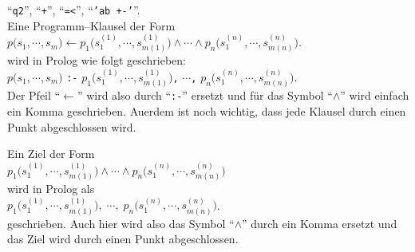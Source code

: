                  ``\texttt{q2}'', ``\texttt{+}'', ``\texttt{=<}'', ``\texttt{'ab +-'}''. \\[0.1cm]
Eine Programm--Klausel der Form \\[0.1cm]
\hspace*{1.3cm} 
$p\big(s_1, \cdots, s_m\big) \leftarrow p_1\big(s^{(1)}_1, \cdots, s^{(1)}_{m(1)}\big) \wedge \cdots \wedge p_n(s^{(n)}_1, \cdots, s^{(n)}_{m(n)}\big)$.  \\[0.1cm]
wird in Prolog wie folgt geschrieben: \\[0.1cm]
\hspace*{1.3cm} 
$p\big(s_1, \cdots, s_m\big)$ \texttt{:-} $p_1\big(s^{(1)}_1, \cdots, s^{(1)}_{m(1)}\big)$\texttt{,} $\cdots$\texttt{,} $p_n(s^{(n)}_1, \cdots, s^{(n)}_{m(n)}\big)$.  \\[0.1cm]
Der Pfeil ``$\leftarrow$'' wird also durch ``\texttt{:-}'' ersetzt und f\"{u}r das
Symbol ``$\wedge$'' wird einfach ein Komma geschrieben.  Au\3erdem ist noch wichtig, dass
jede Klausel durch einen Punkt abgeschlossen wird.

Ein Ziel der Form \\[0.1cm]
\hspace*{1.3cm} $p_1\big(s^{(1)}_1, \cdots, s^{(1)}_{m(1)}\big) \wedge \cdots \wedge p_n(s^{(n)}_1, \cdots, s^{(n)}_{m(n)}\big)$ \\[0.1cm]
wird in Prolog als \\[0.1cm]
\hspace*{1.3cm} $p_1\big(s^{(1)}_1, \cdots, s^{(1)}_{m(1)}\big)\mathtt{,}\; \cdots\mathtt{,}\; p_n(s^{(n)}_1, \cdots, s^{(n)}_{m(n)}\big)$. \\[0.1cm]
geschrieben.  Auch hier wird  also das Symbol ``$\wedge$'' durch ein Komma ersetzt und das
Ziel wird durch einen Punkt abgeschlossen.

